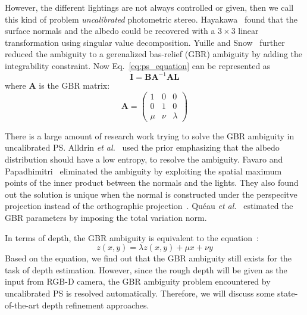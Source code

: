 However, the different lightings are not always controlled or given, then we call this kind of problem \emph{uncalibrated} photometric stereo. 
Hayakawa~\cite{hayakawa1994photometric} found that the surface normals and the albedo could be recovered with a $3\times3$ linear transformation using singular value decomposition. Yuille and Snow~\cite{yuille1997shape} further reduced the ambiguity to a gerenalized bas-relief (GBR) ambiguity by adding the integrability constraint. Now Eq.~\ref{eq:ps_equation} can be represented as
\begin{equation}\label{eq:ps_gbr}
    \mathbf{I} = \mathbf{B}\mathbf{A}^{-1}\mathbf{A}\mathbf{L}    
\end{equation}
where $\mathbf{A}$ is the GBR matrix:
\begin{equation}
    \mathbf{A} = 
    \begin{pmatrix}
        1& 0 & 0\\
        0& 1 & 0\\
        \mu & \nu & \lambda
    \end{pmatrix}
\end{equation}

There is a large amount of research work trying to solve the GBR ambiguity in uncalibrated PS.
Alldrin \emph{et al.}~\cite{alldrin2007resolving} used the prior emphasizing that the albedo distribution should have a low entropy, to resolve the ambiguity.
Favaro and Papadhimitri~\cite{papadhimitri2014closed} eliminated the ambiguity by exploiting the spatial maximum points of the inner product between the normals and the lights.
They also found out the solution is unique when the normal is constructed under the perspecitve projection instead of the orthographic projection~\cite{papadhimitri2013new}.
Qu\'{e}au \emph{et al.}~\cite{queau2015solving} estimated the GBR parameters by imposing the total variation norm.

In terms of depth, the GBR ambiguity is equivalent to the equation~\cite{belhumeur1999bas}:
\begin{equation}
    z(x,y) = \lambda z(x,y) + \mu x + \nu y
\end{equation}
Based on the equation, we find out that the GBR ambiguity still exists for the task of depth estimation.
However, since the rough depth will be given as the input from RGB-D camera, the GBR ambiguity problem encountered by uncalibrated PS is resolved automatically.
Therefore, we will discuss some state-of-the-art depth refinement approaches.

